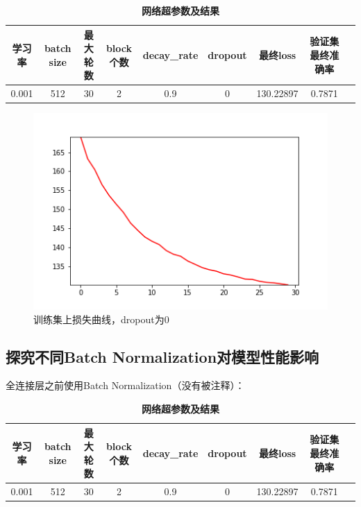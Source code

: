 \documentclass{article}
\begin{document}
\begin{table}[!ht]
	\caption{\textbf{网络超参数及结果}}%
	\centering%
	\begin{tabular}{ccccccccc}
		\hline
		学习率    & batch size & 最大轮数 & block个数 & decay\_rate & dropout & 最终loss & 验证集最终准确率\\ \hline
		0.001 & 512    & 30  &  2  & 0.9 &0 & 130.22897  & 0.7871   \\ \hline
	\end{tabular}
\end{table}

\begin{figure}[!ht]
	\centering %
	\includegraphics[scale=0.5]{runing-loss-4.png}
	\caption{训练集上损失曲线，dropout为0}
\end{figure}

\subsection{探究不同Batch Normalization对模型性能影响}

全连接层之前使用Batch Normalization（没有被注释）：
\begin{table}[!ht]
	\caption{\textbf{网络超参数及结果}}%
	\centering%
	\begin{tabular}{ccccccccc}
		\hline
		学习率    & batch size & 最大轮数 & block个数 & decay\_rate & dropout & 最终loss & 验证集最终准确率\\ \hline
		0.001 & 512    & 30  &  2  & 0.9 &0 & 130.22897  & 0.7871   \\ \hline
	\end{tabular}
\end{table}
\end{document}
